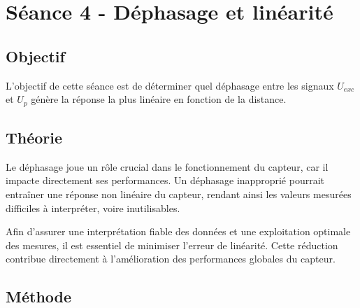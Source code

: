 \section{Séance 4 - Déphasage et linéarité}

\subsection{Objectif}

L'objectif de cette séance est de déterminer quel déphasage entre les signaux 
$U_{exc}$ et $U_{p}$ génère la réponse la plus linéaire en fonction de la distance.

\subsection{Théorie}

Le déphasage joue un rôle crucial dans le fonctionnement du capteur, car il impacte directement 
ses performances. Un déphasage inapproprié pourrait entraîner une réponse non linéaire du capteur,
 rendant ainsi les valeurs mesurées difficiles à interpréter, voire inutilisables. 
 
 Afin d'assurer une interprétation fiable des données et une exploitation optimale des mesures,
  il est essentiel de minimiser l'erreur de linéarité. Cette réduction contribue directement à 
  l'amélioration des performances globales du capteur.


\subsection{Méthode}

